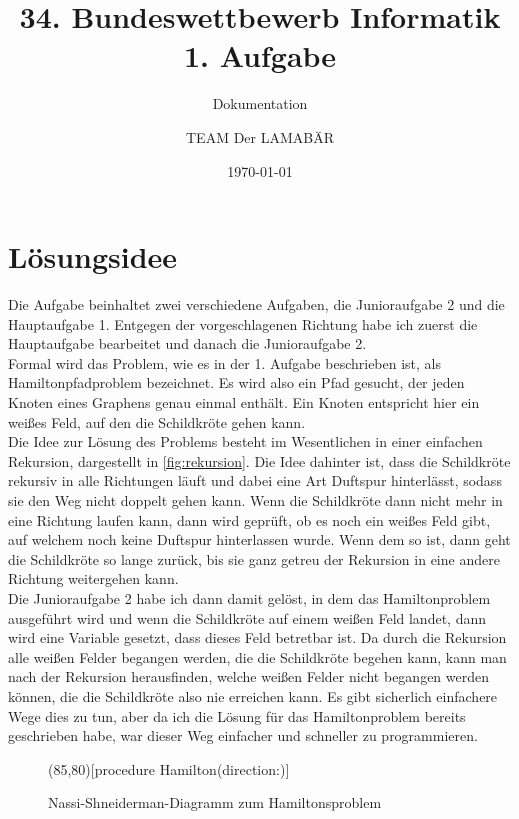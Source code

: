 \documentclass[11pt,a4paper,twocolumn,ngerman]{scrartcl}
\author{TEAM \glqq{}Der LAMABÄR\grqq{}}
\date{\today}
\title{34. Bundeswettbewerb Informatik\\1. Aufgabe}
\subtitle{Dokumentation}
\begin{document}
\maketitle
\tableofcontents
\section{Lösungsidee}
Die Aufgabe beinhaltet zwei verschiedene Aufgaben, die Junioraufgabe 2 und die Hauptaufgabe 1. Entgegen der vorgeschlagenen Richtung habe ich zuerst die Hauptaufgabe bearbeitet und danach die Junioraufgabe 2. \\
Formal wird das Problem, wie es in der 1. Aufgabe beschrieben ist, als \glqq{}Hamiltonpfadproblem\grqq{} bezeichnet. Es wird also ein Pfad gesucht, der jeden Knoten eines Graphens genau einmal enthält. Ein Knoten entspricht hier ein weißes Feld, auf den die Schildkröte gehen kann. \\
Die Idee zur Lösung des Problems besteht im Wesentlichen in einer einfachen Rekursion, dargestellt in \autoref{fig:rekursion}. Die Idee dahinter ist, dass die Schildkröte rekursiv in alle Richtungen läuft und dabei eine Art \glqq{}Duftspur\grqq{} hinterlässt, sodass sie den Weg nicht doppelt gehen kann. Wenn die Schildkröte dann nicht mehr in eine Richtung laufen kann, dann wird geprüft, ob es noch ein weißes Feld gibt, auf welchem noch keine Duftspur hinterlassen wurde. Wenn dem so ist, dann geht die Schildkröte so lange zurück, bis sie ganz getreu der Rekursion in eine andere Richtung weitergehen kann. \\
Die Junioraufgabe 2 habe ich dann damit gelöst, in dem das Hamiltonproblem ausgeführt wird und wenn die Schildkröte auf einem weißen Feld landet, dann wird eine Variable gesetzt, dass dieses Feld betretbar ist. Da durch die Rekursion alle weißen Felder begangen werden, die die Schildkröte begehen kann, kann man nach der Rekursion herausfinden, welche weißen Felder nicht begangen werden können, die die Schildkröte also nie erreichen kann. Es gibt sicherlich einfachere Wege dies zu tun, aber da ich die Lösung für das Hamiltonproblem bereits geschrieben habe, war dieser Weg einfacher und schneller zu programmieren.
\begin{figure}[!hbtp]%
  \caption{Nassi-Shneiderman-Diagramm zum Hamiltonsproblem}
  \label{fig:rekursion}
	\begin{centernss}
		\begin{struktogramm}(85,80)[procedure Hamilton(direction:)]
			\renewcommand{\pLanguage}{Pascal}
				\change
			\ifend
				\change
			\ifend
				\change
			\ifend
				\change
			\ifend
				\change
			\ifend
		\end{struktogramm}
	\end{centernss}
\end{figure}
\end{document}
